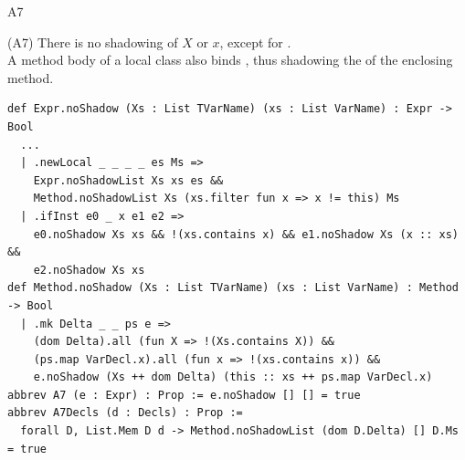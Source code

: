 \begin{cmp}{A7}
\begin{paperside}
(A7) There is no shadowing of $X$ or $x$, except for \Q@this@.\\[1ex]
A method body of a local class also binds \Q@this@, thus shadowing the \Q@this@ of the enclosing method.
\end{paperside}
\begin{leanside}
\begin{lstlisting}[style=leanside]
def Expr.noShadow (Xs : List TVarName) (xs : List VarName) : Expr -> Bool
  ...
  | .newLocal _ _ _ _ es Ms =>
    Expr.noShadowList Xs xs es &&
    Method.noShadowList Xs (xs.filter fun x => x != this) Ms
  | .ifInst e0 _ x e1 e2 =>
    e0.noShadow Xs xs && !(xs.contains x) && e1.noShadow Xs (x :: xs) &&
    e2.noShadow Xs xs
def Method.noShadow (Xs : List TVarName) (xs : List VarName) : Method -> Bool
  | .mk Delta _ _ ps e =>
    (dom Delta).all (fun X => !(Xs.contains X)) &&
    (ps.map VarDecl.x).all (fun x => !(xs.contains x)) &&
    e.noShadow (Xs ++ dom Delta) (this :: xs ++ ps.map VarDecl.x)
abbrev A7 (e : Expr) : Prop := e.noShadow [] [] = true
abbrev A7Decls (d : Decls) : Prop :=
  forall D, List.Mem D d -> Method.noShadowList (dom D.Delta) [] D.Ms = true
\end{lstlisting}
\end{leanside}
\end{cmp}

